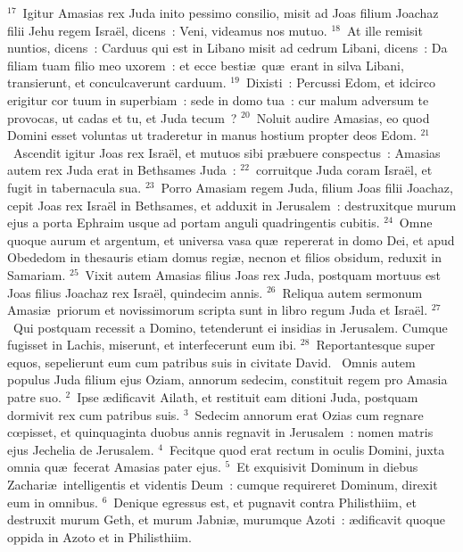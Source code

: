 ${}^{17}$~Igitur Amasias rex Juda inito pessimo consilio, misit ad Joas filium Joachaz filii Jehu regem Isra\"el, dicens~: Veni, videamus nos mutuo.
${}^{18}$~At ille remisit nuntios, dicens~: Carduus qui est in Libano misit ad cedrum Libani, dicens~: Da filiam tuam filio meo uxorem~: et ecce besti\ae\ qu\ae\ erant in silva Libani, transierunt, et conculcaverunt carduum.
${}^{19}$~Dixisti~: Percussi Edom, et idcirco erigitur cor tuum in superbiam~: sede in domo tua~: cur malum adversum te provocas, ut cadas et tu, et Juda tecum~?
${}^{20}$~Noluit audire Amasias, eo quod Domini esset voluntas ut traderetur in manus hostium propter deos Edom.
${}^{21}$~Ascendit igitur Joas rex Isra\"el, et mutuos sibi pr\ae buere conspectus~: Amasias autem rex Juda erat in Bethsames Juda~:
${}^{22}$~corruitque Juda coram Isra\"el, et fugit in tabernacula sua.
${}^{23}$~Porro Amasiam regem Juda, filium Joas filii Joachaz, cepit Joas rex Isra\"el in Bethsames, et adduxit in Jerusalem~: destruxitque murum ejus a porta Ephraim usque ad portam anguli quadringentis cubitis.
${}^{24}$~Omne quoque aurum et argentum, et universa vasa qu\ae\ repererat in domo Dei, et apud Obededom in thesauris etiam domus regi\ae , necnon et filios obsidum, reduxit in Samariam.
${}^{25}$~Vixit autem Amasias filius Joas rex Juda, postquam mortuus est Joas filius Joachaz rex Isra\"el, quindecim annis.
${}^{26}$~Reliqua autem sermonum Amasi\ae\ priorum et novissimorum scripta sunt in libro regum Juda et Isra\"el.
${}^{27}$~Qui postquam recessit a Domino, tetenderunt ei insidias in Jerusalem. Cumque fugisset in Lachis, miserunt, et interfecerunt eum ibi.
${}^{28}$~Reportantesque super equos, sepelierunt eum cum patribus suis in civitate David.
~\lettrine[lines=10,image=true,loversize=0.05,lraise=-0.03]{O}{}mnis autem populus Juda filium ejus Oziam, annorum sedecim, constituit regem pro Amasia patre suo.
${}^{2}$~Ipse \ae dificavit Ailath, et restituit eam ditioni Juda, postquam dormivit rex cum patribus suis.
${}^{3}$~Sedecim annorum erat Ozias cum regnare cœpisset, et quinquaginta duobus annis regnavit in Jerusalem~: nomen matris ejus Jechelia de Jerusalem.
${}^{4}$~Fecitque quod erat rectum in oculis Domini, juxta omnia qu\ae\ fecerat Amasias pater ejus.
${}^{5}$~Et exquisivit Dominum in diebus Zachari\ae\ intelligentis et videntis Deum~: cumque requireret Dominum, direxit eum in omnibus.
${}^{6}$~Denique egressus est, et pugnavit contra Philisthiim, et destruxit murum Geth, et murum Jabni\ae , murumque Azoti~: \ae dificavit quoque oppida in Azoto et in Philisthiim.
